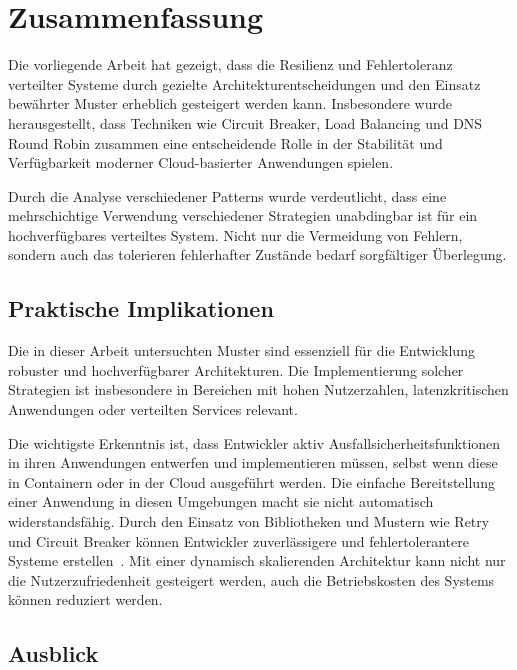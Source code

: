 \section{Zusammenfassung}



Die vorliegende Arbeit hat gezeigt, dass die Resilienz und Fehlertoleranz verteilter Systeme durch gezielte Architekturentscheidungen und den Einsatz bewährter Muster erheblich gesteigert werden kann. Insbesondere wurde herausgestellt, dass Techniken wie Circuit Breaker, Load Balancing und DNS Round Robin zusammen eine entscheidende Rolle in der Stabilität und Verfügbarkeit moderner Cloud-basierter Anwendungen spielen.

Durch die Analyse verschiedener Patterns wurde verdeutlicht, dass eine mehrschichtige Verwendung verschiedener Strategien unabdingbar ist für ein hochverfügbares verteiltes System. Nicht nur die Vermeidung von Fehlern, sondern auch das tolerieren fehlerhafter Zustände bedarf sorgfältiger Überlegung.

\subsection{Praktische Implikationen}
Die in dieser Arbeit untersuchten Muster sind essenziell für die Entwicklung robuster und hochverfügbarer Architekturen. Die Implementierung solcher Strategien ist insbesondere in Bereichen mit hohen Nutzerzahlen, latenzkritischen Anwendungen oder verteilten Services relevant.

Die wichtigste Erkenntnis ist, dass Entwickler aktiv Ausfallsicherheitsfunktionen
in ihren Anwendungen entwerfen und implementieren müssen, selbst wenn diese in Containern oder in der Cloud ausgeführt werden.
Die einfache Bereitstellung einer Anwendung in diesen Umgebungen macht sie nicht automatisch widerstandsfähig.
Durch den Einsatz von Bibliotheken und Mustern wie Retry und Circuit Breaker können Entwickler zuverlässigere und
fehlertolerantere Systeme erstellen~\cite{Haley.28.06.2018}. Mit einer dynamisch skalierenden Architektur kann nicht nur die Nutzerzufriedenheit gesteigert werden, auch die Betriebskosten des Systems können reduziert werden.
\subsection{Ausblick}

